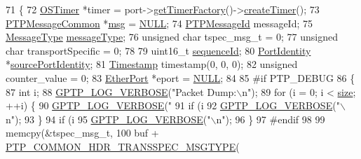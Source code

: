 \begin{DoxyCode}
71 \{
72     \hyperlink{class_o_s_timer}{OSTimer} *timer = port->\hyperlink{class_common_port_ae659108ab426a2d9e8e3c84b63ac6cdc}{getTimerFactory}()->\hyperlink{class_o_s_timer_factory_a93317f4dabe911276934eeb0a18591a5}{createTimer}();
73     \hyperlink{class_p_t_p_message_common}{PTPMessageCommon} *\hyperlink{maap__log__linux_8c_a0c7e58a50354c4a4d6dad428d0e47029}{msg} = \hyperlink{openavb__types__base__pub_8h_a070d2ce7b6bb7e5c05602aa8c308d0c4}{NULL};
74     \hyperlink{class_p_t_p_message_id}{PTPMessageId} messageId;
75     \hyperlink{avbts__message_8hpp_ac6606ebe91c8ac66a2c314c79f5ab013}{MessageType} \hyperlink{class_p_t_p_message_common_adb32627aa5b0e2dbad3ccd88aab07c05}{messageType};
76     \textcolor{keywordtype}{unsigned} \textcolor{keywordtype}{char} tspec\_msg\_t = 0;
77     \textcolor{keywordtype}{unsigned} \textcolor{keywordtype}{char} transportSpecific = 0;
78 
79     uint16\_t \hyperlink{class_p_t_p_message_common_a189710d5cff10c03f77d72a276a5f58e}{sequenceId};
80     \hyperlink{class_port_identity}{PortIdentity} *\hyperlink{class_p_t_p_message_common_a415b5544bdd3ea41dae460fa1af900d9}{sourcePortIdentity};
81     \hyperlink{class_timestamp}{Timestamp} timestamp(0, 0, 0);
82     \textcolor{keywordtype}{unsigned} counter\_value = 0;
83     \hyperlink{class_ether_port}{EtherPort} *eport = \hyperlink{openavb__types__base__pub_8h_a070d2ce7b6bb7e5c05602aa8c308d0c4}{NULL};
84 
85 \textcolor{preprocessor}{#if PTP\_DEBUG}
86     \{
87         \textcolor{keywordtype}{int} i;
88         \hyperlink{gptp__log_8hpp_add03384a2a8099b27e07d041cce77e6f}{GPTP\_LOG\_VERBOSE}(\textcolor{stringliteral}{"Packet Dump:\(\backslash\)n"});
89         \textcolor{keywordflow}{for} (i = 0; i < \hyperlink{gst__avb__playbin_8c_a439227feff9d7f55384e8780cfc2eb82}{size}; ++i) \{
90             \hyperlink{gptp__log_8hpp_add03384a2a8099b27e07d041cce77e6f}{GPTP\_LOG\_VERBOSE}(\textcolor{stringliteral}{"%
91             \textcolor{keywordflow}{if} (i %
92                 \hyperlink{gptp__log_8hpp_add03384a2a8099b27e07d041cce77e6f}{GPTP\_LOG\_VERBOSE}(\textcolor{stringliteral}{"\(\backslash\)n"});
93         \}
94         \textcolor{keywordflow}{if} (i %
95             \hyperlink{gptp__log_8hpp_add03384a2a8099b27e07d041cce77e6f}{GPTP\_LOG\_VERBOSE}(\textcolor{stringliteral}{"\(\backslash\)n"});
96     \}
97 \textcolor{preprocessor}{#endif}
98 
99     memcpy(&tspec\_msg\_t,
100            buf + \hyperlink{avbts__message_8hpp_a102fc939e55e08eadb9bf42508fb65d2}{PTP\_COMMON\_HDR\_TRANSSPEC\_MSGTYPE}(
}
\end{DoxyCode}
